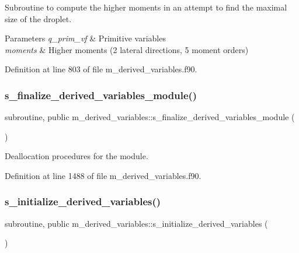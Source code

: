 Subroutine to compute the higher moments in an attempt to find the maximal size of the droplet. 


\begin{DoxyParams}{Parameters}
{\em q\+\_\+prim\+\_\+vf} & Primitive variables \\
\hline
{\em moments} & Higher moments (2 lateral directions, 5 moment orders) \\
\hline
\end{DoxyParams}


Definition at line 803 of file m\+\_\+derived\+\_\+variables.\+f90.

\mbox{\label{namespacem__derived__variables_a735665bf598281689158d9d6e075f3d4}} 
\subsubsection{\texorpdfstring{s\+\_\+finalize\+\_\+derived\+\_\+variables\+\_\+module()}{s\_finalize\_derived\_variables\_module()}}
{\footnotesize\ttfamily subroutine, public m\+\_\+derived\+\_\+variables\+::s\+\_\+finalize\+\_\+derived\+\_\+variables\+\_\+module (\begin{DoxyParamCaption}{ }\end{DoxyParamCaption})}



Deallocation procedures for the module. 



Definition at line 1488 of file m\+\_\+derived\+\_\+variables.\+f90.

\mbox{\label{namespacem__derived__variables_ae9dbea9bb47e84dbd380c480ad5144b8}} 
\subsubsection{\texorpdfstring{s\+\_\+initialize\+\_\+derived\+\_\+variables()}{s\_initialize\_derived\_variables()}}
{\footnotesize\ttfamily subroutine, public m\+\_\+derived\+\_\+variables\+::s\+\_\+initialize\+\_\+derived\+\_\+variables (\begin{DoxyParamCaption}{ }\end{DoxyParamCaption})}



